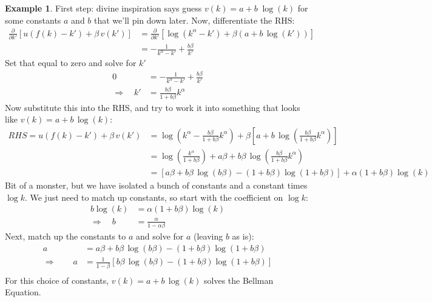 \documentclass[12pt]{article}
\numberwithin{equation}{section} %
\theoremstyle{plain}
\theoremstyle{definition}
\newtheorem{ex}[thm]{Example}
\theoremstyle{remark}
\begin{document}
\begin{ex}
First step: divine inspiration says guess $v(k) = a + b \; \log(k)$ for
some constants $a$ and $b$ that we'll pin down later.
Now, differentiate the RHS:
\begin{align*}
  \frac{\partial}{\partial k'}
  \left[
  u(f(k)-k') + \beta\, v(k')
  \right]
  &=
  \frac{\partial}{\partial k'}
  \left[
    \log\left(
    k^\alpha - k'
    \right)
    + \beta (a + b\, \log(k'))
  \right] \\
  &= -\frac{1}{k^\alpha-k'}
  + \frac{b\beta}{k'}
\end{align*}
Set that equal to zero and solve for $k'$
\begin{align*}
  0
  &= -\frac{1}{k^\alpha-k'}
  + \frac{b\beta}{k'}\\
  \Rightarrow\quad
  k' &= \frac{b\beta}{1+b\beta} k^\alpha
\end{align*}
Now substitute this into the RHS, and try to work it into something that
looks like $v(k) = a + b\,\log(k)$:
\begin{align*}
  RHS = u(f(k)-k') + \beta \, v(k')
  &=
  \log\left(
    k^\alpha - \frac{b\beta}{1+b\beta} k^\alpha
  \right)
  + \beta
    \left[
      a + b\,\log\left(\frac{b\beta}{1+b\beta} k^\alpha\right)
    \right] \\
  &=
  \log\left(
    \frac{k^\alpha}{1+b\beta}
  \right)
  + a\beta + b\beta\,\log\left(\frac{b\beta}{1+b\beta} k^\alpha\right) \\
  &=
  [a\beta
  + b\beta\,\log\left(b\beta\right)
  - (1+b\beta)\log\left( 1+b\beta \right)]
  +\alpha(1+b\beta)\log\left( k \right)
\end{align*}
Bit of a monster, but we have isolated a bunch of constants and a
constant times $\log k$. We just need to match up constants, so start
with the coefficient on $\log k$:
\begin{align*}
  b\log(k)
  &= \alpha(1+b\beta) \log(k) \\
  \Rightarrow\quad
  b &= \frac{\alpha}{1-\alpha \beta}
\end{align*}
Next, match up the constants to $a$ and solve for $a$ (leaving $b$ as
is):
\begin{align*}
  a
  &=
  a\beta + b\beta\,\log\left(b\beta\right)
  - (1+b\beta)\log\left( 1+b\beta \right) \\
  \Rightarrow\qquad
  a
  &=
  \frac{1}{1-\beta}
  \left[
    b\beta\,\log\left(b\beta\right)
  - (1+b\beta)\log\left( 1+b\beta \right) \right]\\
\end{align*}
For this choice of constants, $v(k) = a + b\,\log(k)$ solves the Bellman
Equation.
\end{ex}
\end{document}
